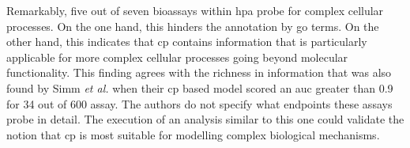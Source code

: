 Remarkably, five out of seven bioassays within \acl{hpa} probe for complex cellular processes. On the one hand, this hinders the annotation by \ac{go} terms. On the other hand, this indicates that \ac{cp} contains information that is particularly applicable for more complex cellular processes going beyond molecular functionality. This finding agrees with the richness in information that was also found by Simm \textit{et al.}\cite{Simm2017} when their \ac{cp} based model scored an \ac{auc} greater than \num{0.9} for \num{34} out of \num{600} assay. The authors do not specify what endpoints these assays probe in detail. The execution of an analysis similar to this one could validate the notion that \ac{cp} is most suitable for modelling complex biological mechanisms. 